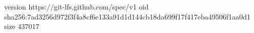 version https://git-lfs.github.com/spec/v1
oid sha256:7ad3256d972f3f4a8cf6e133a91d1d144cb18da699f17f417eba49506f1aa0d1
size 437017
